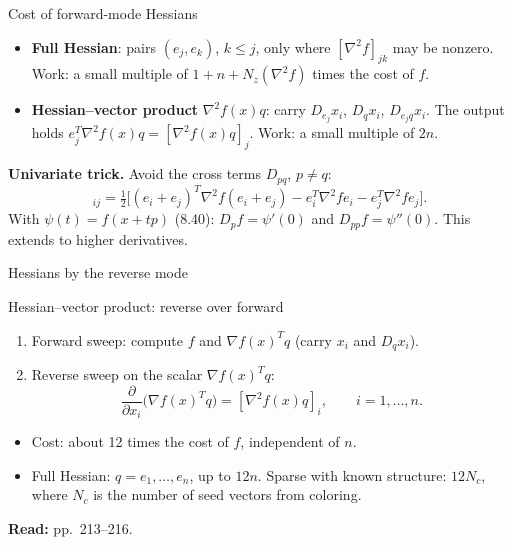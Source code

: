 \documentclass[12pt,aspectratio=169]{beamer}
\newcommand{\readpp}[1]{{\color{red!80!black}\textbf{Read:} #1}}
\begin{document}
\begin{frame}{Cost of forward-mode Hessians}
  \begin{itemize}
    \item \textbf{Full Hessian}: pairs $(e_j,e_k)$, $k\le j$, only where $[\nabla^2 f]_{jk}$ may be nonzero.
      Work: a small multiple of $1+n+N_z(\nabla^2 f)$ times the cost of $f$.
    \item \textbf{Hessian--vector product} $\nabla^2 f(x)q$: carry $D_{e_j}x_i$, $D_qx_i$, $D_{e_jq}x_i$.
      The output holds $e_j^T\nabla^2f(x)q=[\nabla^2 f(x)q]_j$.
      Work: a small multiple of $2n$.
  \end{itemize}
  \textbf{Univariate trick.} Avoid the cross terms $D_{pq}$, $p\neq q$:
  \begin{equation}
    [\nabla^2 f]_{ij} = \tfrac12\bigl[(e_i+e_j)^T\nabla^2 f(e_i+e_j) - e_i^T\nabla^2 f e_i - e_j^T\nabla^2 f e_j\bigr]. \tag{8.39}
  \end{equation}
  With $\psi(t)=f(x+tp)$ (8.40): $D_pf=\psi'(0)$ and $D_{pp}f=\psi''(0)$. This extends to higher derivatives.
\end{frame}

\begin{frame}{Hessians by the reverse mode}
  \begin{block}{Hessian--vector product: reverse over forward}
    \begin{enumerate}
      \item Forward sweep: compute $f$ and $\nabla f(x)^Tq$ (carry $x_i$ and $D_qx_i$).
      \item Reverse sweep on the scalar $\nabla f(x)^Tq$:
        \[
          \frac{\partial}{\partial x_i}\bigl(\nabla f(x)^Tq\bigr) = [\nabla^2 f(x)q]_i,\qquad i=1,\dots,n.
        \]
    \end{enumerate}
  \end{block}
  \begin{itemize}
    \item Cost: about \alert{12 times} the cost of $f$, \alert{independent of $n$}.
    \item Full Hessian: $q=e_1,\dots,e_n$, up to $12n$. Sparse with known structure: $12N_c$, where $N_c$ is the number of seed vectors from coloring.
  \end{itemize}
  \readpp{pp.~213--216.}
\end{frame}
\end{document}

